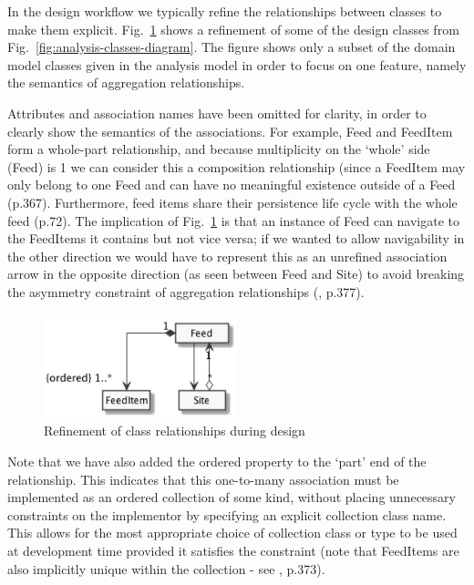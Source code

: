 \documentclass[runningheads,a4paper]{llncs}
\begin{document}
In the design workflow we typically refine the relationships between classes to make them explicit. Fig.~\ref{fig:design-classes-diagram} shows a refinement of some of the design classes from Fig.~\ref{fig:analysis-classes-diagram}. The figure shows only a subset of the domain model classes given in the analysis model in order to focus on one feature, namely the semantics of aggregation relationships.

Attributes and association names have been omitted for clarity, in order to clearly show the semantics of the associations. For example, \textsf{Feed} and \textsf{FeedItem} form a whole-part relationship, and because multiplicity on the `whole' side (\textsf{Feed}) is 1 we can consider this a composition relationship (since a \textsf{FeedItem} may only belong to one \textsf{Feed} and can have no meaningful existence outside of a \textsf{Feed} \cite{arlow} (p.367). Furthermore, feed items share their persistence life cycle with the whole feed \cite{ambler} (p.72). The implication of Fig.~\ref{fig:design-classes-diagram} is that an instance of \textsf{Feed} can navigate to the \textsf{FeedItem}s it contains but not vice versa; if we wanted to allow navigability in the other direction we would have to represent this as an unrefined association arrow in the opposite direction (as seen between \textsf{Feed} and \textsf{Site}) to avoid breaking the asymmetry constraint of aggregation relationships (\cite{arlow}, p.377).

\begin{figure}
\centering
\includegraphics[width=0.5\textwidth]{design-classes}
\caption{Refinement of class relationships during design}
\label{fig:design-classes-diagram}
\end{figure}

Note that we have also added the \textsf{ordered} property to the `part' end of the relationship. This indicates that this one-to-many association must be implemented as an ordered collection of some kind, without placing unnecessary constraints on the implementor by specifying an explicit collection class name. This allows for the most appropriate choice of collection class or type to be used at development time provided it satisfies the constraint (note that \textsf{FeedItem}s are also implicitly unique within the collection - see \cite{arlow}, p.373).
\end{document}
